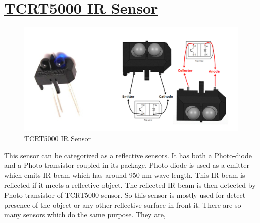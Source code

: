 \documentclass[a4paper,11pt,twocolumn]{article}
\begin{document}
	



\section*{\underline{TCRT5000 IR Sensor}}

\begin{center}
	\begin{figure}[!h]
		\centering
		\includegraphics[scale=0.5]{figures/irsensor}
		\caption{TCRT5000 IR Sensor\cite{pinout}}
	\end{figure}
\end{center}

This sensor can be categorized as a  reflective sensors. It has both a Photo-diode and a Photo-transistor coupled in its package. Photo-diode is used as a emitter which emits IR beam which has around 950 nm wave length. This IR beam is reflected if it meets a reflective object. The reflected IR beam is then detected by Photo-transistor of TCRT5000 sensor. So this sensor is mostly used for detect presence of the object or any other reflective surface in front it. There are so many sensors which do the same purpose. They are,
\end{document}

